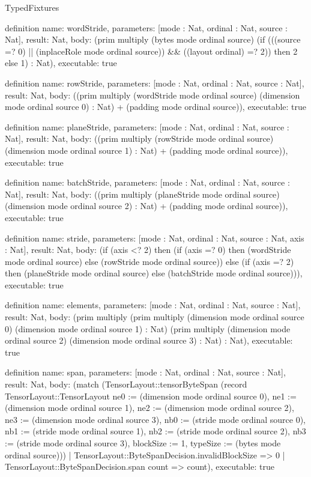 \begin{lexlean}{TypedFixtures}
\begin{semanticmodule}
definition{
  name: wordStride,
  parameters: [mode : Nat, ordinal : Nat, source : Nat],
  result: Nat,
  body: (prim multiply (bytes mode ordinal source) (if (((source =? 0) || (inplaceRole mode ordinal source)) && ((layout ordinal) =? 2)) then 2 else 1) : Nat),
  executable: true
}

definition{
  name: rowStride,
  parameters: [mode : Nat, ordinal : Nat, source : Nat],
  result: Nat,
  body: ((prim multiply (wordStride mode ordinal source) (dimension mode ordinal source 0) : Nat) + (padding mode ordinal source)),
  executable: true
}

definition{
  name: planeStride,
  parameters: [mode : Nat, ordinal : Nat, source : Nat],
  result: Nat,
  body: ((prim multiply (rowStride mode ordinal source) (dimension mode ordinal source 1) : Nat) + (padding mode ordinal source)),
  executable: true
}

definition{
  name: batchStride,
  parameters: [mode : Nat, ordinal : Nat, source : Nat],
  result: Nat,
  body: ((prim multiply (planeStride mode ordinal source) (dimension mode ordinal source 2) : Nat) + (padding mode ordinal source)),
  executable: true
}

definition{
  name: stride,
  parameters: [mode : Nat, ordinal : Nat, source : Nat, axis : Nat],
  result: Nat,
  body: (if (axis <? 2) then (if (axis =? 0) then (wordStride mode ordinal source) else (rowStride mode ordinal source)) else (if (axis =? 2) then (planeStride mode ordinal source) else (batchStride mode ordinal source))),
  executable: true
}

definition{
  name: elements,
  parameters: [mode : Nat, ordinal : Nat, source : Nat],
  result: Nat,
  body: (prim multiply (prim multiply (dimension mode ordinal source 0) (dimension mode ordinal source 1) : Nat) (prim multiply (dimension mode ordinal source 2) (dimension mode ordinal source 3) : Nat) : Nat),
  executable: true
}

definition{
  name: span,
  parameters: [mode : Nat, ordinal : Nat, source : Nat],
  result: Nat,
  body: (match (TensorLayout::tensorByteSpan (record TensorLayout::TensorLayout {ne0 := (dimension mode ordinal source 0), ne1 := (dimension mode ordinal source 1), ne2 := (dimension mode ordinal source 2), ne3 := (dimension mode ordinal source 3), nb0 := (stride mode ordinal source 0), nb1 := (stride mode ordinal source 1), nb2 := (stride mode ordinal source 2), nb3 := (stride mode ordinal source 3), blockSize := 1, typeSize := (bytes mode ordinal source)}))
    | TensorLayout::ByteSpanDecision.invalidBlockSize => 0
    | TensorLayout::ByteSpanDecision.span count => count),
  executable: true
}


\end{semanticmodule}
\end{lexlean}
